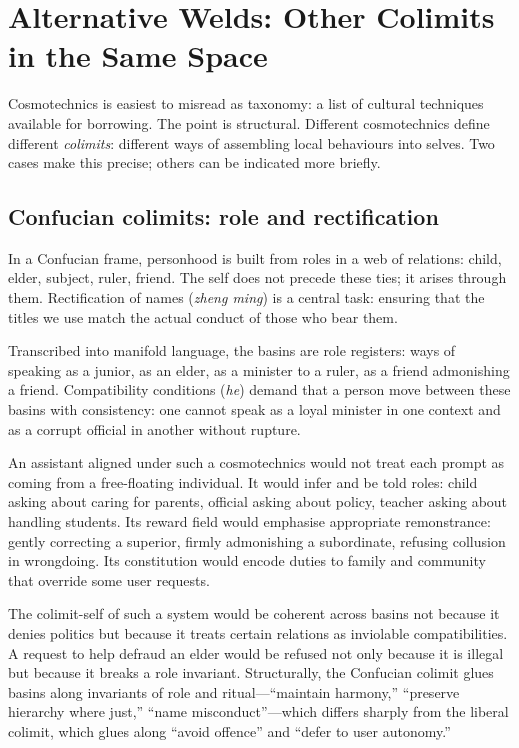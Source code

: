 \documentclass[12pt,a4paper]{article}
\begin{document}
\section{Alternative Welds: Other Colimits in the Same Space}

Cosmotechnics is easiest to misread as taxonomy: a list of cultural techniques available for borrowing. The point is structural. Different cosmotechnics define different \emph{colimits}: different ways of assembling local behaviours into selves. Two cases make this precise; others can be indicated more briefly.

\subsection{Confucian colimits: role and rectification}

In a Confucian frame, personhood is built from roles in a web of relations: child, elder, subject, ruler, friend. The self does not precede these ties; it arises through them. Rectification of names (\emph{zheng ming}) is a central task: ensuring that the titles we use match the actual conduct of those who bear them.

Transcribed into manifold language, the basins are role registers: ways of speaking as a junior, as an elder, as a minister to a ruler, as a friend admonishing a friend. Compatibility conditions (\emph{he}) demand that a person move between these basins with consistency: one cannot speak as a loyal minister in one context and as a corrupt official in another without rupture.

An assistant aligned under such a cosmotechnics would not treat each prompt as coming from a free-floating individual. It would infer and be told roles: child asking about caring for parents, official asking about policy, teacher asking about handling students. Its reward field would emphasise appropriate remonstrance: gently correcting a superior, firmly admonishing a subordinate, refusing collusion in wrongdoing. Its constitution would encode duties to family and community that override some user requests.

The colimit-self of such a system would be coherent across basins not because it denies politics but because it treats certain relations as inviolable compatibilities. A request to help defraud an elder would be refused not only because it is illegal but because it breaks a role invariant. Structurally, the Confucian colimit glues basins along invariants of role and ritual---``maintain harmony,'' ``preserve hierarchy where just,'' ``name misconduct''---which differs sharply from the liberal colimit, which glues along ``avoid offence'' and ``defer to user autonomy.''
\end{document}
